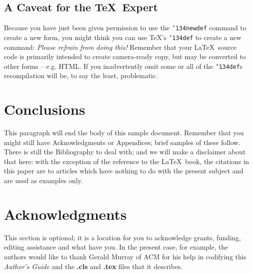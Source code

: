 \documentclass{vldb}
\begin{document}
\subsection*{A {\secit Caveat} for the \TeX\ Expert}
Because you have just been given permission to
use the \texttt{{\char'134}newdef} command to create a
new form, you might think you can
use \TeX's \texttt{{\char'134}def} to create a
new command: \textit{Please refrain from doing this!}
Remember that your \LaTeX\ source code is primarily intended
to create camera-ready copy, but may be converted
to other forms -- e.g. HTML. If you inadvertently omit
some or all of the \texttt{{\char'134}def}s recompilation will
be, to say the least, problematic.

\section{Conclusions}
This paragraph will end the body of this sample document.
Remember that you might still have Acknowledgments or
Appendices; brief samples of these
follow.  There is still the Bibliography to deal with; and
we will make a disclaimer about that here: with the exception
of the reference to the \LaTeX\ book, the citations in
this paper are to articles which have nothing to
do with the present subject and are used as
examples only.

\balance

\section{Acknowledgments}
This section is optional; it is a location for you
to acknowledge grants, funding, editing assistance and
what have you.  In the present case, for example, the
authors would like to thank Gerald Murray of ACM for
his help in codifying this \textit{Author's Guide}
and the \textbf{.cls} and \textbf{.tex} files that it describes.



\end{document}
